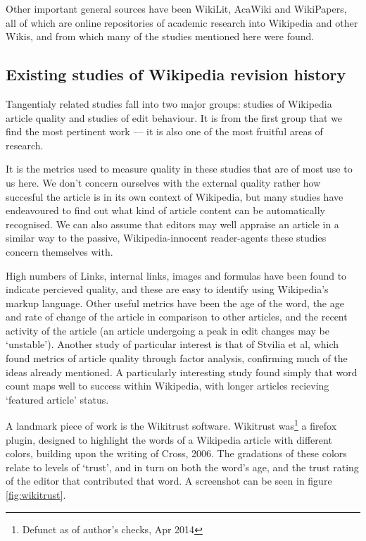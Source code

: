 Other important general sources have been WikiLit,\cite{wikilit}
AcaWiki\cite{acawiki} and WikiPapers\cite{wikipapers}, all of which
are online repositories of academic research into Wikipedia and other
Wikis, and from which many of the studies mentioned here were found.


\subsection*{Existing studies of Wikipedia revision history}
Tangentialy related studies fall into two major groups: studies of
Wikipedia article quality and studies of edit behaviour.  It is from
the first group that we find the most pertinent work --- it is also
one of the most fruitful areas of research.

It is the metrics used to measure quality in these studies that are of
most use to us here. We don't concern ourselves with the external
quality rather how succesful the article is in its own context of
Wikipedia, but many studies have endeavoured to find out what kind of
article content can be automatically recognised. We can also assume
that editors may well appraise an article in a similar way to the
passive, Wikipedia-innocent reader-agents these studies concern
themselves with.

High numbers of Links, internal links, images and formulas have been
found to indicate percieved
quality,\cite{Lucassen2010}\cite{mcguinness2006} and these are easy to
identify using Wikipedia's markup language. Other useful metrics have
been the age of the word,\cite{Cross2006} the age and rate of change
of the article in comparison to other articles,\cite{Zeng2006} and the
recent activity of the article (an article undergoing a peak in edit
changes may be `unstable').\cite{Adler2006} Another study of
particular interest is that of Stvilia et al, which found metrics of
article quality through factor analysis,\cite{Stvilia2005} confirming
much of the ideas already mentioned. A particularly interesting study
found simply that word count maps well to success within Wikipedia,
with longer articles recieving `featured article'
status.\cite{blumenstock2008size}

A landmark piece of work is the Wikitrust software.\cite{Adler2007}
Wikitrust was\footnote{Defunct as of author's checks, Apr 2014} a
firefox plugin, designed to highlight the words of a Wikipedia article
with different colors, building upon the writing of Cross,
2006.\cite{Cross2006} The gradations of these colors relate to levels
of `trust', and in turn on both the word's age, and the trust rating
of the editor that contributed that word. A screenshot can be seen in
figure \ref{fig:wikitrust}. 

